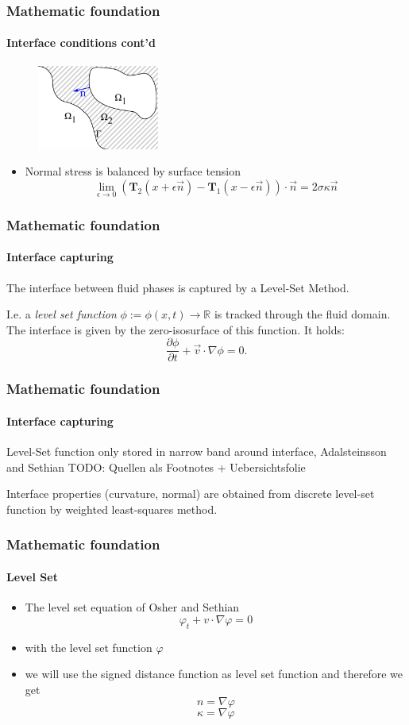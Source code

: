 \documentclass[ucs]{beamer}
\begin{document}
\begin{frame}
\frametitle{Mathematic foundation}
\framesubtitle{Interface conditions cont'd}
\begin{figure}[h!]
\includegraphics[width=4cm]{skizze.png}
\end{figure}
\begin{itemize}
\item<1->Normal stress is balanced by surface tension
  $$\lim_{\epsilon \to 0}(\textbf{T}_2(x+\epsilon \vec n) - \textbf{T}_1(x-\epsilon \vec n)) \cdot \vec n= 2\sigma \kappa \vec n$$
\end{itemize}
\vspace{-.5cm}
\end{frame}

\begin{frame}
\frametitle{Mathematic foundation}
\framesubtitle{Interface capturing}
The interface between fluid phases is captured by a Level-Set Method.

I.e. a \textit{level set function} $\phi:= \phi(x,t) \rightarrow \mathbb{R}$ is tracked through the fluid domain. The interface is given by the zero-isosurface of this function.
It holds:
$$ \frac{\partial \phi}{\partial t} + \vec v \cdot \nabla \phi = 0.$$
\end{frame}

\begin{frame}
\frametitle{Mathematic foundation}
\framesubtitle{Interface capturing}
Level-Set function only stored in narrow band around interface, Adalsteinsson and Sethian
TODO: Quellen als Footnotes + Uebersichtsfolie

Interface properties (curvature, normal) are obtained from discrete level-set function by weighted least-squares method.
\end{frame}

\begin{frame}
\frametitle{Mathematic foundation}
\framesubtitle{Level Set}
\begin{itemize}
\item<1-> The level set equation of Osher and Sethian
 $$\varphi_t+v \cdot \nabla \varphi = 0$$
\item<2-> with the level set function $\varphi$
\item<3-> we will use the signed distance function as level set function and therefore we get
$$n = \nabla \varphi$$
$$\kappa = \nabla \varphi$$
\end{itemize}
\end{frame}
\end{document}
